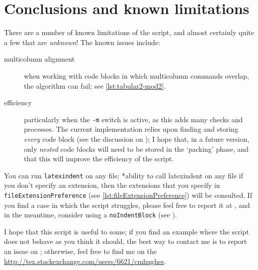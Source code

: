 \section{Conclusions and known limitations}\label{sec:knownlimitations}
 There are a number of known limitations of the script, and almost certainly quite a few
 that are \emph{unknown}! The known issues include:
 \begin{description}
  \item[multicolumn alignment] when working with code blocks in which multicolumn
        commands overlap, the algorithm can fail; see \vref{lst:tabular2-mod2}.
  \item[efficiency] particularly when the \texttt{-m} switch is active, as this adds many
        checks and processes. The current implementation relies upon finding and storing
        \emph{every} code block (see the discussion on ); I hope
        that, in a future version, only \emph{nested} code blocks will need to be stored
        in the `packing' phase, and that this will improve the efficiency of the script.
 \end{description}

 You can run \texttt{latexindent} on any file; *{ability to call
 latexindent on any file} if you don't specify an extension, then the extensions that you
 specify in \lstinline[breaklines=true]!fileExtensionPreference! (see
 \vref{lst:fileExtensionPreference}) will be consulted. If you find a case in which the
 script struggles, please feel free to report it at \cite{latexindent-home}, and in the
 meantime, consider using a \texttt{noIndentBlock} (see ).%

 I hope that this script is useful to some; if you find an example where the script does
 not behave as you think it should, the best way to contact me is to report an issue on
 \cite{latexindent-home}; otherwise, feel free to find me on the
 \url{http://tex.stackexchange.com/users/6621/cmhughes}.
